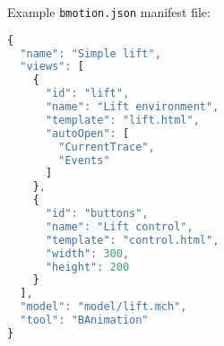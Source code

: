 Example \texttt{bmotion.json} manifest file:

\begin{lstlisting}[language=JavaScript]
{
  "name": "Simple lift",
  "views": [
    {
      "id": "lift",
      "name": "Lift environment",
      "template": "lift.html",
      "autoOpen": [
        "CurrentTrace",
        "Events"
      ]
    },
    {
      "id": "buttons",
      "name": "Lift control",
      "template": "control.html",
      "width": 300,
      "height": 200
    }
  ],
  "model": "model/lift.mch",
  "tool": "BAnimation"
}
\end{lstlisting}